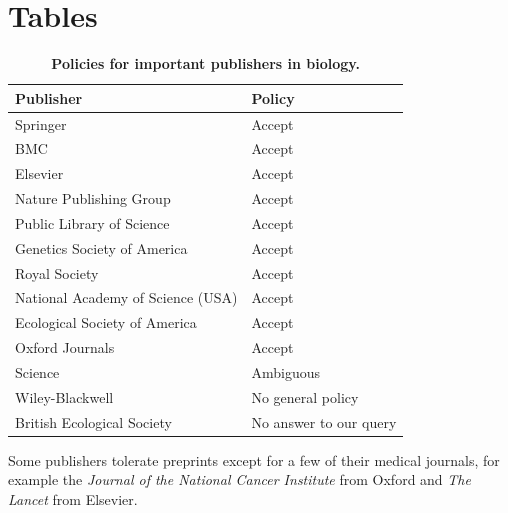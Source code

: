 \documentclass[10pt]{article}
\begin{document}
\newpage
\section*{Tables}

\begin{table}[!ht]
    \caption{\bf{Policies for important publishers in biology.}}
    \begin{tabular}{|ll|}
    \hline
    Publisher                                   & Policy \\
    \hline
    Springer                            	& Accept \\
    BMC                                 	& Accept \\
    Elsevier                            	& Accept \\
    Nature Publishing Group             	& Accept \\
    Public Library of Science           	& Accept \\
    Genetics Society of America                 & Accept \\
    Royal Society                       	& Accept \\
    National Academy of Science (USA)           & Accept \\
    Ecological Society of America       	& Accept \\
    Oxford Journals                             & Accept \\
    Science                             	& Ambiguous \\
    Wiley-Blackwell                       	& No general policy \\
    British Ecological Society                  & No answer to our query \\
    \hline
    \end{tabular}
    \begin{flushleft} Some publishers tolerate preprints except for a few of
their medical journals, for example the \emph{ Journal of the National Cancer
Institute} from Oxford and \emph{The Lancet} from Elsevier.  \end{flushleft}
    \label{table:policies}
\end{table}
\end{document}

